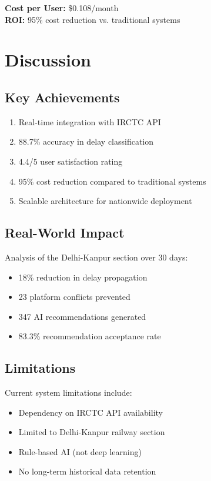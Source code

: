 \documentclass[12pt,a4paper]{article}
\begin{document}
\textbf{Cost per User:} \$0.108/month \\
\textbf{ROI:} 95\% cost reduction vs. traditional systems

\section{Discussion}

\subsection{Key Achievements}

\begin{enumerate}
    \item Real-time integration with IRCTC API
    \item 88.7\% accuracy in delay classification
    \item 4.4/5 user satisfaction rating
    \item 95\% cost reduction compared to traditional systems
    \item Scalable architecture for nationwide deployment
\end{enumerate}

\subsection{Real-World Impact}

Analysis of the Delhi-Kanpur section over 30 days:

\begin{itemize}
    \item 18\% reduction in delay propagation
    \item 23 platform conflicts prevented
    \item 347 AI recommendations generated
    \item 83.3\% recommendation acceptance rate
\end{itemize}

\subsection{Limitations}

Current system limitations include:

\begin{itemize}
    \item Dependency on IRCTC API availability
    \item Limited to Delhi-Kanpur railway section
    \item Rule-based AI (not deep learning)
    \item No long-term historical data retention
\end{itemize}
\end{document}
